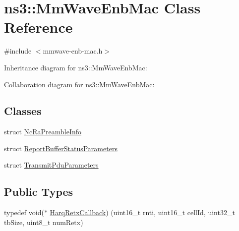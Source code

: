 \hypertarget{classns3_1_1MmWaveEnbMac}{}\section{ns3\+:\+:Mm\+Wave\+Enb\+Mac Class Reference}
\label{classns3_1_1MmWaveEnbMac}


{\ttfamily \#include $<$mmwave-\/enb-\/mac.\+h$>$}



Inheritance diagram for ns3\+:\+:Mm\+Wave\+Enb\+Mac\+:


Collaboration diagram for ns3\+:\+:Mm\+Wave\+Enb\+Mac\+:
\subsection*{Classes}
\begin{DoxyCompactItemize}
\item 
struct \hyperlink{structns3_1_1MmWaveEnbMac_1_1NcRaPreambleInfo}{Nc\+Ra\+Preamble\+Info}
\item 
struct \hyperlink{structns3_1_1MmWaveEnbMac_1_1ReportBufferStatusParameters}{Report\+Buffer\+Status\+Parameters}
\item 
struct \hyperlink{structns3_1_1MmWaveEnbMac_1_1TransmitPduParameters}{Transmit\+Pdu\+Parameters}
\end{DoxyCompactItemize}
\subsection*{Public Types}
\begin{DoxyCompactItemize}
\item 
typedef void($\ast$ \hyperlink{classns3_1_1MmWaveEnbMac_ab1883d2ce5ff21b1021a76aaf8e354ce}{Harq\+Retx\+Callback}) (uint16\+\_\+t rnti, uint16\+\_\+t cell\+Id, uint32\+\_\+t tb\+Size, uint8\+\_\+t num\+Retx)
\end{DoxyCompactItemize}
